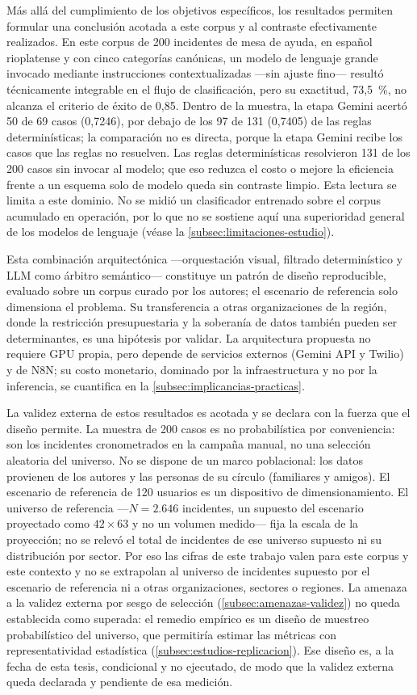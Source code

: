 Más allá del cumplimiento de los objetivos específicos, los resultados permiten formular una conclusión acotada a este corpus y al contraste efectivamente realizados. En este corpus de 200 incidentes de mesa de ayuda, en español rioplatense y con cinco categorías canónicas, un modelo de lenguaje grande invocado mediante instrucciones contextualizadas ---sin ajuste fino--- resultó técnicamente integrable en el flujo de clasificación, pero su exactitud, 73,5~\%, no alcanza el criterio de éxito de 0,85. Dentro de la muestra, la etapa Gemini acertó 50 de 69 casos (0,7246), por debajo de los 97 de 131 (0,7405) de las reglas determinísticas; la comparación no es directa, porque la etapa Gemini recibe los casos que las reglas no resuelven. Las reglas determinísticas resolvieron 131 de los 200 casos sin invocar al modelo; que eso reduzca el costo o mejore la eficiencia frente a un esquema solo de modelo queda sin contraste limpio. Esta lectura se limita a este dominio. No se midió un clasificador entrenado sobre el corpus acumulado en operación, por lo que no se sostiene aquí una superioridad general de los modelos de lenguaje (véase la \autoref{subsec:limitaciones-estudio}).

Esta combinación arquitectónica ---orquestación visual, filtrado determinístico y LLM como árbitro semántico--- constituye un patrón de diseño reproducible, evaluado sobre un corpus curado por los autores; el escenario de referencia solo dimensiona el problema. Su transferencia a otras organizaciones de la región, donde la restricción presupuestaria y la soberanía de datos también pueden ser determinantes, es una hipótesis por validar. La arquitectura propuesta no requiere GPU propia, pero depende de servicios externos (Gemini API y Twilio) y de N8N; su costo monetario, dominado por la infraestructura y no por la inferencia, se cuantifica en la \autoref{subsec:implicancias-practicas}.

La validez externa de estos resultados es acotada y se declara con la fuerza que el diseño permite. La muestra de 200 casos es no probabilística por conveniencia: son los incidentes cronometrados en la campaña manual, no una selección aleatoria del universo. No se dispone de un marco poblacional: los datos provienen de los autores y las personas de su círculo (familiares y amigos). El escenario de referencia de 120 usuarios es un dispositivo de dimensionamiento. El universo de referencia ---\(N = 2.646\) incidentes, un supuesto del escenario proyectado como \(42 \times 63\) y no un volumen medido--- fija la escala de la proyección; no se relevó el total de incidentes de ese universo supuesto ni su distribución por sector. Por eso las cifras de este trabajo valen para este corpus y este contexto y no se extrapolan al universo de incidentes supuesto por el escenario de referencia ni a otras organizaciones, sectores o regiones. La amenaza a la validez externa por sesgo de selección (\autoref{subsec:amenazas-validez}) no queda establecida como superada: el remedio empírico es un diseño de muestreo probabilístico del universo, que permitiría estimar las métricas con representatividad estadística (\autoref{subsec:estudios-replicacion}). Ese diseño es, a la fecha de esta tesis, condicional y no ejecutado, de modo que la validez externa queda declarada y pendiente de esa medición.

